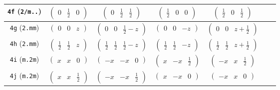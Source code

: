 \documentclass[fleqn,9pt,landscape]{jsarticle}
\begin{document}
\begin{center}
\begin{longtable}{ccccccc}
{\tt 4f} ({\tt 2/m..}) & $ \begin{pmatrix} 0 & \frac{1}{2} & 0 \end{pmatrix} $ & $ \begin{pmatrix} 0 & \frac{1}{2} & \frac{1}{2} \end{pmatrix} $ & $ \begin{pmatrix} \frac{1}{2} & 0 & 0 \end{pmatrix} $ & $ \begin{pmatrix} \frac{1}{2} & 0 & \frac{1}{2} \end{pmatrix} $ & $  $ & $  $ \\ \hline
{\tt 4g} ({\tt 2.mm}) & $ \begin{pmatrix} 0 & 0 & z \end{pmatrix} $ & $ \begin{pmatrix} 0 & 0 & \frac{1}{2} - z \end{pmatrix} $ & $ \begin{pmatrix} 0 & 0 & - z \end{pmatrix} $ & $ \begin{pmatrix} 0 & 0 & z + \frac{1}{2} \end{pmatrix} $ & $  $ & $  $ \\ \hline
{\tt 4h} ({\tt 2.mm}) & $ \begin{pmatrix} \frac{1}{2} & \frac{1}{2} & z \end{pmatrix} $ & $ \begin{pmatrix} \frac{1}{2} & \frac{1}{2} & \frac{1}{2} - z \end{pmatrix} $ & $ \begin{pmatrix} \frac{1}{2} & \frac{1}{2} & - z \end{pmatrix} $ & $ \begin{pmatrix} \frac{1}{2} & \frac{1}{2} & z + \frac{1}{2} \end{pmatrix} $ & $  $ & $  $ \\ \hline
{\tt 4i} ({\tt m.2m}) & $ \begin{pmatrix} x & x & 0 \end{pmatrix} $ & $ \begin{pmatrix} - x & - x & 0 \end{pmatrix} $ & $ \begin{pmatrix} x & - x & \frac{1}{2} \end{pmatrix} $ & $ \begin{pmatrix} - x & x & \frac{1}{2} \end{pmatrix} $ & $  $ & $  $ \\ \hline
{\tt 4j} ({\tt m.2m}) & $ \begin{pmatrix} x & x & \frac{1}{2} \end{pmatrix} $ & $ \begin{pmatrix} - x & - x & \frac{1}{2} \end{pmatrix} $ & $ \begin{pmatrix} x & - x & 0 \end{pmatrix} $ & $ \begin{pmatrix} - x & x & 0 \end{pmatrix} $ & $  $ & $  $ \\ \hline

\end{longtable}
\end{center}
\end{document}
